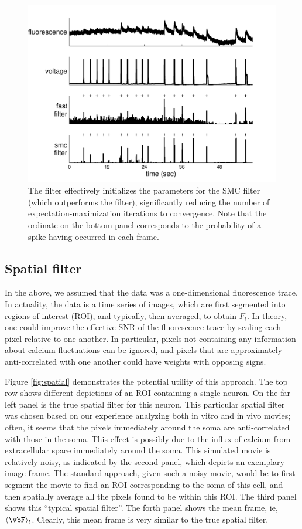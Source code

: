 \begin{figure}[h!]
\centering \includegraphics[width=.9\linewidth]{../figs/smc_init12}
\caption{The \foopsi filter effectively initializes the parameters for the SMC filter (which outperforms the \foopsi filter), significantly reducing the number of expectation-maximization iterations to convergence.  Note that the ordinate on the bottom panel corresponds to the probability of a spike having occurred in each frame.} \label{fig:smc_init}
\end{figure}

\subsection{Spatial filter}

In the above, we assumed that the data was a one-dimensional fluorescence trace.  In actuality, the data is a time series of images, which are first segmented into regions-of-interest (ROI), and typically, then averaged, to obtain $F_t$.  In theory, one could improve the effective SNR of the fluorescence trace by scaling each pixel relative to one another.  In particular, pixels not containing any information about calcium fluctuations can be ignored, and pixels that are approximately anti-correlated with one another could have weights with opposing signs.  

Figure \ref{fig:spatial} demonstrates the potential utility of this approach.  The top row shows different depictions of an ROI containing a single neuron.  On the far left panel is the true spatial filter for this neuron.  This particular spatial filter was chosen based on our experience analyzing both in vitro and in vivo movies; often, it seems that the pixels immediately around the soma are anti-correlated with those in the soma.  This effect is possibly due to the influx of calcium from extracellular space immediately around the soma.  This simulated movie is relatively noisy, as indicated by the second panel, which depicts an exemplary image frame.  The standard approach, given such a noisy movie, would be to first segment the movie to find an ROI corresponding to the soma of this cell, and then spatially average all the pixels found to be within this ROI.  The third panel shows this ``typical spatial filter''.  The forth panel shows the mean frame, ie, $\langle \vbF \rangle_t$.  Clearly, this mean frame is very similar to the true spatial filter.

